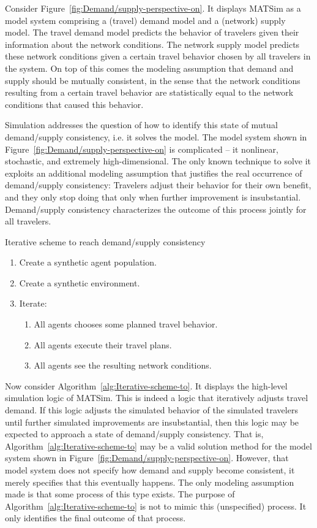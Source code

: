 Consider Figure~\ref{fig:Demand/supply-perspective-on}. It displays
MATSim as a model system comprising a (travel) demand model and a
(network) supply model. The travel demand model predicts the behavior
of travelers given their information about the network conditions.
The network supply model predicts these network conditions given a
certain travel behavior chosen by all travelers in the system. On
top of this comes the modeling assumption that demand and supply should
be mutually consistent, in the sense that the network conditions resulting
from a certain travel behavior are statistically equal to the network
conditions that caused this behavior.

Simulation addresses the question of how to identify this state of
mutual demand/supply consistency, i.e. it solves the model. The model
system shown in Figure~\ref{fig:Demand/supply-perspective-on} is
complicated -- it nonlinear, stochastic, and extremely high-dimensional.
The only known technique to solve it exploits an additional modeling
assumption that justifies the real occurrence of demand/supply consistency:
Travelers adjust their behavior for their own benefit, and they only
stop doing that only when further improvement is insubstantial. Demand/supply
consistency characterizes the outcome of this process jointly for
all travelers.

\begin{algorithm}
\caption{\label{alg:Iterative-scheme-to}Iterative scheme to reach demand/supply
consistency}

\begin{enumerate}
\item Create a synthetic agent population.
\item Create a synthetic environment.
\item Iterate:

\begin{enumerate}
\item All agents chooses some planned travel behavior.
\item All agents execute their travel plans.
\item All agents see the resulting network conditions.\end{enumerate}
\end{enumerate}
\end{algorithm}


Now consider Algorithm~\ref{alg:Iterative-scheme-to}. It displays
the high-level simulation logic of MATSim. This is indeed a logic
that iteratively adjusts travel demand. If this logic adjusts the
simulated behavior of the simulated travelers until further simulated
improvements are insubstantial, then this logic may be expected to
approach a state of demand/supply consistency. That is, Algorithm~\ref{alg:Iterative-scheme-to}
may be a valid solution method for the model system shown in Figure~\ref{fig:Demand/supply-perspective-on}.
However, that model system does not specify how demand and supply
become consistent, it merely specifies that this eventually happens.
The only modeling assumption made is that some process of this type
exists. The purpose of Algorithm~\ref{alg:Iterative-scheme-to} is
not to mimic this (unspecified) process. It only identifies the final
outcome of that process.

